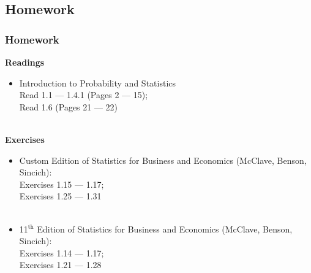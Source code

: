 \documentclass[xcolor=svgnames, compress]{beamer}
\begin{document}
\subsection*{Homework}

\begin{frame}
\frametitle{Homework}


\vspace{-0.5cm}

\textbf{Readings}

\begin{itemize}\justifying
\item	Introduction to Probability and Statistics\\
	\quad  Read 1.1 --- 1.4.1 (Pages 2 --- 15);\\
	\quad  Read 1.6 (Pages 21 --- 22)
\end{itemize}
\hfill\\
\textbf{Exercises}

\begin{itemize}\justifying
\item	Custom Edition of Statistics for Business and Economics (McClave, Benson, Sincich):\\
	\quad Exercises 1.15 --- 1.17;\\
	\quad Exercises 1.25 --- 1.31 \\
\hfill\\
\item	11$^{\text{th}}$ Edition of Statistics for Business and Economics (McClave, Benson, Sincich):\\
	\quad Exercises 1.14 --- 1.17; \\
	\quad Exercises 1.21 --- 1.28\\
\end{itemize}





\end{frame}
\end{document}
